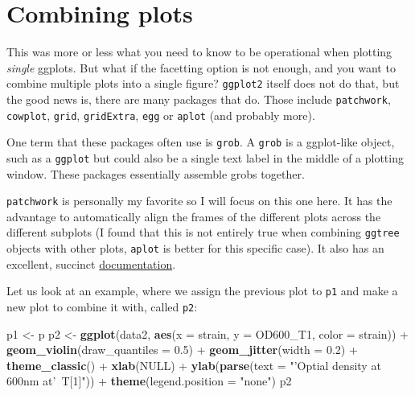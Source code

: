 \documentclass[]{book}
\newenvironment{Shaded}{}{}
\newcommand{\DataTypeTok}[1]{\textcolor[rgb]{0.56,0.13,0.00}{#1}}
\newcommand{\FloatTok}[1]{\textcolor[rgb]{0.25,0.63,0.44}{#1}}
\newcommand{\KeywordTok}[1]{\textcolor[rgb]{0.00,0.44,0.13}{\textbf{#1}}}
\newcommand{\NormalTok}[1]{#1}
\newcommand{\OperatorTok}[1]{\textcolor[rgb]{0.40,0.40,0.40}{#1}}
\newcommand{\OtherTok}[1]{\textcolor[rgb]{0.00,0.44,0.13}{#1}}
\newcommand{\StringTok}[1]{\textcolor[rgb]{0.25,0.44,0.63}{#1}}
\begin{document}
\hypertarget{combining-plots}{%
\section{Combining plots}\label{combining-plots}}

This was more or less what you need to know to be operational when plotting \emph{single} ggplots. But what if the facetting option is not enough, and you want to combine multiple plots into a single figure? \texttt{ggplot2} itself does not do that, but the good news is, there are many packages that do. Those include \texttt{patchwork}, \texttt{cowplot}, \texttt{grid}, \texttt{gridExtra}, \texttt{egg} or \texttt{aplot} (and probably more).

One term that these packages often use is \texttt{grob}. A \texttt{grob} is a ggplot-like object, such as a \texttt{ggplot} but could also be a single text label in the middle of a plotting window. These packages essentially assemble grobs together.

\texttt{patchwork} is personally my favorite so I will focus on this one here. It has the advantage to automatically align the frames of the different plots across the different subplots (I found that this is not entirely true when combining \texttt{ggtree} objects with other plots, \texttt{aplot} is better for this specific case). It also has an excellent, succinct \href{https://patchwork.data-imaginist.com/}{documentation}.

Let us look at an example, where we assign the previous plot to \texttt{p1} and make a new plot to combine it with, called \texttt{p2}:

\begin{Shaded}
\begin{Highlighting}[]
\NormalTok{p1 <-}\StringTok{ }\NormalTok{p}
\NormalTok{p2 <-}\StringTok{ }\KeywordTok{ggplot}\NormalTok{(data2, }\KeywordTok{aes}\NormalTok{(}\DataTypeTok{x =}\NormalTok{ strain, }\DataTypeTok{y =}\NormalTok{ OD600_T1, }\DataTypeTok{color =}\NormalTok{ strain)) }\OperatorTok{+}
\StringTok{  }\KeywordTok{geom_violin}\NormalTok{(}\DataTypeTok{draw_quantiles =} \FloatTok{0.5}\NormalTok{) }\OperatorTok{+}
\StringTok{  }\KeywordTok{geom_jitter}\NormalTok{(}\DataTypeTok{width =} \FloatTok{0.2}\NormalTok{) }\OperatorTok{+}
\StringTok{  }\KeywordTok{theme_classic}\NormalTok{() }\OperatorTok{+}
\StringTok{  }\KeywordTok{xlab}\NormalTok{(}\OtherTok{NULL}\NormalTok{) }\OperatorTok{+}
\StringTok{  }\KeywordTok{ylab}\NormalTok{(}\KeywordTok{parse}\NormalTok{(}\DataTypeTok{text =} \StringTok{"'Optial density at 600nm at'~T[1]"}\NormalTok{)) }\OperatorTok{+}
\StringTok{  }\KeywordTok{theme}\NormalTok{(}\DataTypeTok{legend.position =} \StringTok{"none"}\NormalTok{)}
\NormalTok{p2}
\end{Highlighting}
\end{Shaded}
\end{document}

